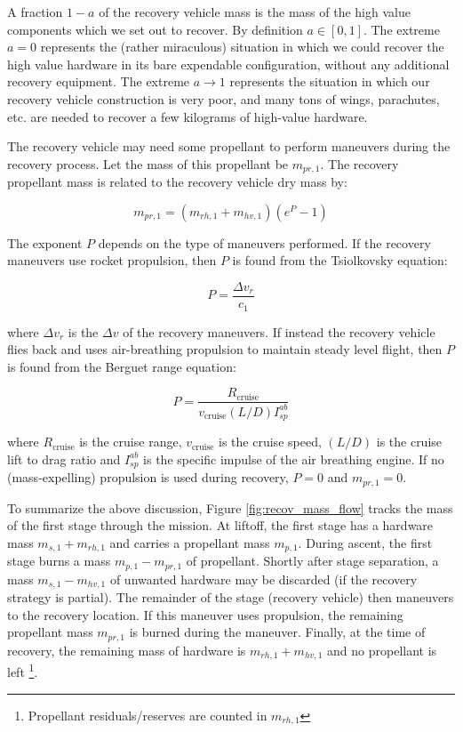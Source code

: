 \documentclass[conf]{new-aiaa}
\begin{document}
A fraction $1-a$ of the recovery vehicle mass is the mass of the high value components which we set out to recover. By definition $a \in [0, 1]$. The extreme $a=0$ represents the (rather miraculous) situation in which we could recover the high value hardware in its bare expendable configuration, without any additional recovery equipment. The extreme $a \rightarrow 1$ represents the situation in which our recovery vehicle construction is very poor, and many tons of wings, parachutes, etc. are needed to recover a few kilograms of high-value hardware.

The recovery vehicle may need some propellant to perform maneuvers during the recovery process. Let the mass of this propellant be $m_{pr,1}$. The recovery propellant mass is related to the recovery vehicle dry mass by:

\begin{equation}
m_{pr,1} = (m_{rh,1} + m_{hv,1}) \left( e^P - 1 \right)
\end{equation}

The exponent $P$ depends on the type of maneuvers performed. If the recovery maneuvers use rocket propulsion, then $P$ is found from the Tsiolkovsky equation:

\begin{equation}
\label{eq:rocket_p}
P = \frac{\Delta v_r}{c_1}
\end{equation}

where $\Delta v_r$ is the $\Delta v$ of the recovery maneuvers. If instead the recovery vehicle flies back and uses air-breathing propulsion to maintain steady level flight, then $P$ is found from the Berguet range equation:

\begin{equation}
\label{eq:berguet_p}
P =  \frac{R_{\mathrm{cruise}}}{v_{\mathrm{cruise}} (L/D) I_{sp}^{ab}}
\end{equation}

where $R_{\mathrm{cruise}}$ is the cruise range, $v_{\mathrm{cruise}}$ is the cruise speed, $(L/D)$ is the cruise lift to drag ratio and $I_{sp}^{ab}$ is the specific impulse of the air breathing engine. If no (mass-expelling) propulsion is used during recovery, $P = 0$ and $m_{pr,1} = 0$.

To summarize the above discussion, Figure \ref{fig:recov_mass_flow} tracks the mass of the first stage through the mission. At liftoff, the first stage has a hardware mass $m_{s,1} + m_{rh,1}$ and carries a propellant mass $m_{p,1}$. During ascent, the first stage burns a mass $m_{p,1} - m_{pr,1}$ of propellant. Shortly after stage separation, a mass $m_{s,1} - m_{hv,1}$ of unwanted hardware may be discarded (if the recovery strategy is partial). The remainder of the stage  (recovery vehicle) then maneuvers to the recovery location. If this maneuver uses propulsion, the remaining propellant mass $m_{pr,1}$ is burned during the maneuver. Finally, at the time of recovery, the remaining mass of hardware is $m_{rh,1} + m_{hv,1}$ and no propellant is left \footnote{Propellant residuals/reserves are counted in $m_{rh,1}$}.
\end{document}
